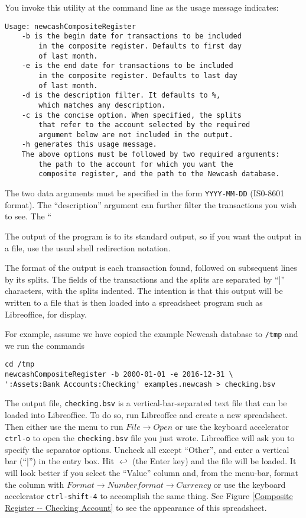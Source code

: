 \documentclass{report}
\begin{document}
You invoke this utility at the command line as the usage message indicates:
\begin{verbatim}
Usage: newcashCompositeRegister
	-b is the begin date for transactions to be included
        in the composite register. Defaults to first day
        of last month.
	-e is the end date for transactions to be included
        in the composite register. Defaults to last day
        of last month.
    -d is the description filter. It defaults to %,
        which matches any description.
    -c is the concise option. When specified, the splits
        that refer to the account selected by the required
        argument below are not included in the output.
	-h generates this usage message.
    The above options must be followed by two required arguments:
        the path to the account for which you want the
        composite register, and the path to the Newcash database.
\end{verbatim}

The two data arguments must be specified in the form \verb|YYYY-MM-DD| (IS0-8601 format). The ``description'' argument can further filter the transactions you wish to see. The ``%

The output of the program is to its standard output, so if you want the output in a file, use the usual shell redirection notation.

The format of the output is each transaction found, followed on subsequent lines by its splits. The fields of the transactions and the splits are separated by ``|'' characters, with the splits indented. The intention is that this output will be written to a file that is then loaded into a spreadsheet program such as Libreoffice, for display. 

For example, assume we have copied the example Newcash database to \verb|/tmp| and we run the commands
\begin{verbatim}
cd /tmp
newcashCompositeRegister -b 2000-01-01 -e 2016-12-31 \
':Assets:Bank Accounts:Checking' examples.newcash > checking.bsv
\end{verbatim}

The output file, \verb|checking.bsv| is a vertical-bar-separated text file that can be loaded into Libreoffice. To do so, run Libreoffce and create a new spreadsheet. Then either use the menu to run $File \rightarrow Open$ or use the keyboard accelerator \verb|ctrl-o| to open the \verb|checking.bsv| file you just wrote. Libreoffice will ask you to specify the separator options. Uncheck all except ``Other'', and enter a vertical bar (``|'') in the entry box. Hit $\hookleftarrow$ (the Enter key) and the file will be loaded. It will look better if you select the ``Value'' column and, from the menu-bar, format the column with $Format \rightarrow Number format \rightarrow Currency$ or use the keyboard accelerator \verb|ctrl-shift-4| to accomplish the same thing. See Figure \ref{Composite Register -- Checking Account} to see the appearance of this spreadsheet.
\end{document}
